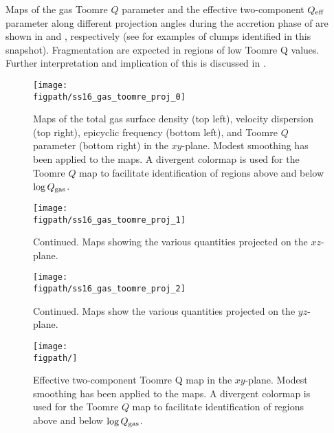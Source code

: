 \IfFileExists{emulateapjlegacy.cls}{\documentclass[iop]{emulateapjlegacy}}{\documentclass[iop]{emulateapj}}
\begin{document}
Maps of the gas Toomre $Q$ parameter and the effective two-component $Q_{\rm eff}$ parameter along different projection angles during the accretion phase of \flower are shown in  and , respectively (see  for examples of clumps identified 
in this snapshot). Fragmentation are expected in regions of low Toomre Q values.
Further interpretation and implication of this is discussed in .


\begin{figure*}[htbp]
\centering
\texttt{[image: \\figpath/ss16\_gas\_toomre\_proj\_0]}
\caption{
Maps of the total gas surface density (top left), 
velocity dispersion (top right),
epicyclic frequency (bottom left), 
and Toomre $Q$ parameter (bottom right) in the $xy$-plane.
Modest smoothing has been applied to the maps. 
A divergent colormap is used for the Toomre $Q$ map to facilitate 
identification of regions above and below $\log{Q_{\rm gas}}$.
\label{fig:Q}}
\addtocounter{figure}{-1}
\end{figure*}

\begin{figure*}[htbp]
\centering
\texttt{[image: \\figpath/ss16\_gas\_toomre\_proj\_1]}
\caption{Continued. Maps showing the various quantities projected on the $xz$-plane.}
\addtocounter{figure}{-1}
\end{figure*}

\begin{figure*}[htbp]
\centering
\texttt{[image: \\figpath/ss16\_gas\_toomre\_proj\_2]}
\caption{Continued. Maps show the various quantities projected on the $yz$-plane.}
\end{figure*}



\begin{figure*}[htbp]
\centering
\texttt{[image: \\figpath/]}
\caption{
Effective two-component Toomre Q map in the $xy$-plane.
Modest smoothing has been applied to the maps. 
A divergent colormap is used for the Toomre $Q$ map to facilitate 
identification of regions above and below $\log{Q_{\rm gas}}$.
\label{fig:Qeff}}
\end{figure*}



\end{document}
